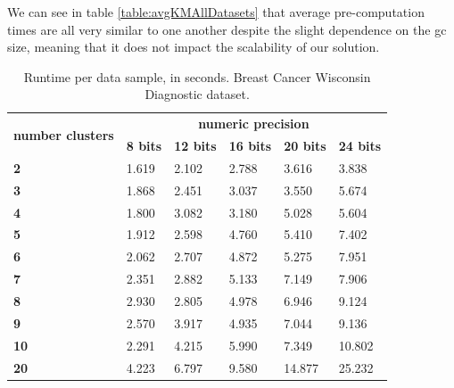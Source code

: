 We can see in table \ref{table:avgKMAllDatasets} that average pre-computation times are all very similar to one another despite the slight dependence on the \ac{gc} size, meaning that it does not impact the scalability of our solution.

\begin{table}[H]
\centering
\caption{Runtime per data sample, in seconds. Breast Cancer Wisconsin Diagnostic dataset.}
\label{table:runtimeKMBCW}
\begin{tabular}{|l|l|l|l|l|l|}
\hline
\multirow{2}{*}{\textbf{number clusters}} & \multicolumn{5}{c|}{\textbf{numeric precision}}                                             \\ \cline{2-6} 
                                          & \textbf{8 bits} & \textbf{12 bits} & \textbf{16 bits} & \textbf{20 bits} & \textbf{24 bits} \\ \hline
\textbf{2}                                & 1.619           & 2.102            & 2.788            & 3.616            & 3.838            \\ \hline
\textbf{3}                                & 1.868           & 2.451            & 3.037            & 3.550            & 5.674            \\ \hline
\textbf{4}                                & 1.800           & 3.082            & 3.180            & 5.028            & 5.604            \\ \hline
\textbf{5}                                & 1.912           & 2.598            & 4.760            & 5.410            & 7.402            \\ \hline
\textbf{6}                                & 2.062           & 2.707            & 4.872            & 5.275            & 7.951            \\ \hline
\textbf{7}                                & 2.351           & 2.882            & 5.133            & 7.149            & 7.906            \\ \hline
\textbf{8}                                & 2.930           & 2.805            & 4.978            & 6.946            & 9.124            \\ \hline
\textbf{9}                                & 2.570           & 3.917            & 4.935            & 7.044            & 9.136            \\ \hline
\textbf{10}                               & 2.291           & 4.215            & 5.990            & 7.349            & 10.802           \\ \hline
\textbf{20}                               & 4.223           & 6.797            & 9.580            & 14.877           & 25.232           \\ \hline

\end{tabular}
\end{table}
